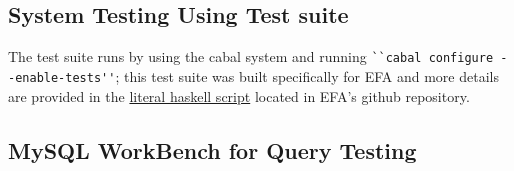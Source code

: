 \subsection{System Testing Using Test suite}
The test suite runs by using the cabal system and running 
\verb|``cabal configure --enable-tests''|; this test suite was built 
specifically for EFA and 
more details are provided in the 
\href{https://github.com/4ZP6Capstone2015/ampersand/blob/master/src/Database/Design/Ampersand/ECA2SQL/FreshName.lhs}{literal
 haskell script} located in EFA's github repository.

\subsection{MySQL WorkBench for Query Testing}